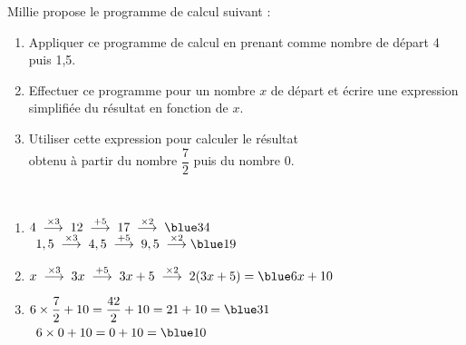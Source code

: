 \begin{colonne*exercice}
\begin{exercice} %
   Millie propose le programme de calcul suivant :
   \begin{center}
   \end{center}
   \begin{enumerate}
      \item Appliquer ce programme de calcul en prenant comme nombre de départ 4 puis 1,5.
      \item Effectuer ce programme pour un nombre $x$ de départ et écrire une expression simplifiée du résultat en fonction de $x$.
      \item Utiliser cette expression pour calculer le résultat \\ [1mm] obtenu à partir du nombre $\dfrac72$ puis du nombre $0$. \\ [5mm]
   \end{enumerate}
\end{exercice}

\begin{corrige}
   \ \\ [-5mm]
   \begin{enumerate}
      \item $4\;\stackrel{\times3}{\longrightarrow}\;12\;\stackrel{+5}{\longrightarrow}\;17\;\stackrel{\times2}{\longrightarrow}\;\blue 34$ \\ \medskip
         \quad\, $1,5\;\stackrel{\times3}{\longrightarrow}\;4,5\;\stackrel{+5}{\longrightarrow}\;9,5\;\stackrel{\times2}{\longrightarrow}\blue 19$ \\ \medskip
      \item $x\;\stackrel{\times3}{\longrightarrow}\;3x\;\stackrel{+5}{\longrightarrow}\;3x+5\;\stackrel{\times2}{\longrightarrow}\;2(3x+5) =\blue 6x+10$ \\ \medskip
      \item $6\times\dfrac72+10 =\dfrac{42}{2}+10 =21+10 =\blue 31$ \\ \medskip
      \quad\, $6\times0+10 =0+10 =\blue 10$ \\
   \end{enumerate}


\end{corrige}
\end{colonne*exercice}
